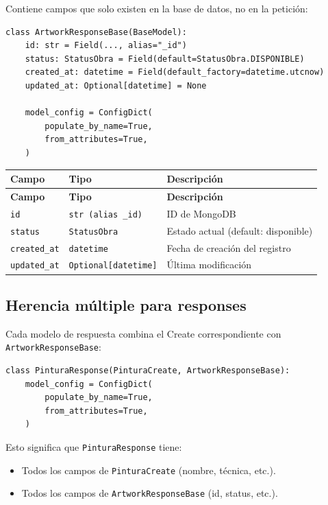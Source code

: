 \documentclass[12pt,a4paper]{article}
\begin{document}
Contiene campos que solo existen en la base de datos, no en la petición:

\begin{lstlisting}
class ArtworkResponseBase(BaseModel):
    id: str = Field(..., alias="_id")
    status: StatusObra = Field(default=StatusObra.DISPONIBLE)
    created_at: datetime = Field(default_factory=datetime.utcnow)
    updated_at: Optional[datetime] = None

    model_config = ConfigDict(
        populate_by_name=True,
        from_attributes=True,
    )
\end{lstlisting}

\begin{longtable}{lll}
\toprule
\textbf{Campo} & \textbf{Tipo} & \textbf{Descripción} \\
\midrule
\endfirsthead
\toprule
\textbf{Campo} & \textbf{Tipo} & \textbf{Descripción} \\
\midrule
\endhead
\bottomrule
\endfoot
\texttt{id} & \texttt{str (alias \_id)} & ID de MongoDB \\
\texttt{status} & \texttt{StatusObra} & Estado actual (default: disponible) \\
\texttt{created\_at} & \texttt{datetime} & Fecha de creación del registro \\
\texttt{updated\_at} & \texttt{Optional[datetime]} & Última modificación \\
\end{longtable}

\subsection{Herencia múltiple para responses}

Cada modelo de respuesta combina el Create correspondiente con
\texttt{ArtworkResponseBase}:

\begin{lstlisting}
class PinturaResponse(PinturaCreate, ArtworkResponseBase):
    model_config = ConfigDict(
        populate_by_name=True,
        from_attributes=True,
    )
\end{lstlisting}

Esto significa que \texttt{PinturaResponse} tiene:
\begin{itemize}
    \item Todos los campos de \texttt{PinturaCreate} (nombre, técnica, etc.).
    \item Todos los campos de \texttt{ArtworkResponseBase} (id, status, etc.).
\end{itemize}
\end{document}
